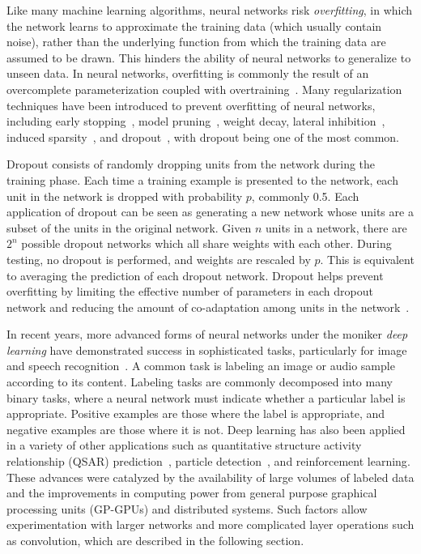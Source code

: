 Like many machine learning algorithms, neural networks risk \emph{overfitting}, in which the network learns to approximate the training data (which usually contain noise), rather than the underlying function from which the training data are assumed to be drawn.
This hinders the ability of neural networks to generalize to unseen data.
In neural networks, overfitting is commonly the result of an overcomplete parameterization coupled with overtraining~\cite{reed1993, dalianis1993}.
Many regularization techniques have been introduced to prevent overfitting of neural networks, including early stopping~\cite{morgan1990}, model pruning~\cite{reed1993}, weight decay\cite{krogh1992}, lateral inhibition~\cite{krizhevsky2012}, induced sparsity~\cite{ng2011, makhzani2015}, and dropout~\cite{srivastava2014}, with dropout being one of the most common. 

Dropout consists of randomly dropping units from the network during the training phase.
Each time a training example is presented to the network, each unit in the network is dropped with probability $p$, commonly 0.5.
Each application of dropout can be seen as generating a new network whose units are a subset of the units in the original network.
Given $n$ units in a network, there are $2^n$ possible dropout networks which all share weights with each other.
During testing, no dropout is performed, and weights are rescaled by $p$.
This is equivalent to averaging the prediction of each dropout network.
Dropout helps prevent overfitting by limiting the effective number of parameters in each dropout network and reducing the amount of co-adaptation among units in the network~\cite{srivastava2014}.


In recent years, more advanced forms of neural networks under the moniker \emph{deep learning} have demonstrated success in sophisticated tasks, particularly for image and speech recognition~\cite{krizhevsky2012, lecun2015, masci2011, hinton2012, he2016}.
A common task is labeling an image or audio sample according to its content.
Labeling tasks are commonly decomposed into many binary tasks, where a neural network must indicate whether a particular label is appropriate.
Positive examples are those where the label is appropriate, and negative examples are those where it is not.
Deep learning has also been applied in a variety of other applications such as quantitative structure activity relationship (QSAR) prediction~\cite{ma2015}, particle detection~\cite{ciodaro2012}, and reinforcement learning\cite{mnih2015}.
These advances were catalyzed by the availability of large volumes of labeled data\cite{deng2009, krizhevsky2009} and the improvements in computing power from general purpose graphical processing units (GP-GPUs) and distributed systems\cite{chetlur2014, chu2007}.
Such factors allow experimentation with larger networks and more complicated layer operations such as convolution, which are described in the following section.

